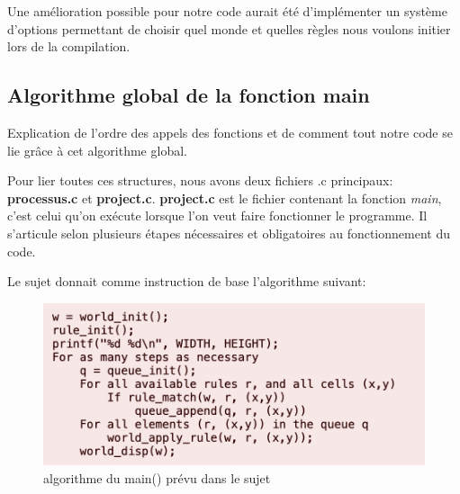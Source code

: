 \documentclass[11pt, a4paper]{article}
\begin{document}
Une amélioration possible pour notre code aurait été d'implémenter un système d'options permettant de choisir quel monde et quelles règles nous voulons initier lors de la compilation.

\subsection{Algorithme global de la fonction main}
Explication de l'ordre des appels des fonctions et de comment tout notre code se lie grâce à cet algorithme global.

Pour lier toutes ces structures, nous avons deux fichiers .c principaux: \textbf{processus.c} et \textbf{project.c}.
\textbf{project.c} est le fichier contenant la fonction \textit{main}, c'est celui qu'on exécute lorsque l'on veut faire fonctionner le programme. 
Il s'articule selon plusieurs étapes nécessaires et obligatoires au fonctionnement du code. 

Le sujet donnait comme instruction de base l'algorithme suivant:

\begin{figure}[!h]
    \centering
    \includegraphics[scale=0.7]{./algo_sujet.png}
    \caption{algorithme du main() prévu dans le sujet}
    \label{fig:my_label}
\end{figure}
\end{document}

